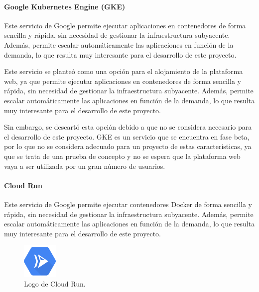
                \paragraph{Google Kubernetes Engine (GKE)}

                    Este servicio de Google permite ejecutar aplicaciones en contenedores de forma sencilla y rápida, sin necesidad de gestionar la infraestructura subyacente. Además, permite escalar automáticamente las aplicaciones en función de la demanda, lo que resulta muy interesante para el desarrollo de este proyecto.

                    Este servicio se planteó como una opción para el alojamiento de la plataforma web, ya que permite ejecutar aplicaciones en contenedores de forma sencilla y rápida, sin necesidad de gestionar la infraestructura subyacente. Además, permite escalar automáticamente las aplicaciones en función de la demanda, lo que resulta muy interesante para el desarrollo de este proyecto.

                    Sin embargo, se descartó esta opción debido a que no se considera necesario para el desarrollo de este proyecto. GKE es un servicio que se encuentra en fase beta, por lo que no se considera adecuado para un proyecto de estas características, ya que se trata de una prueba de concepto y no se espera que la plataforma web vaya a ser utilizada por un gran número de usuarios.

                \paragraph{Cloud Run}

                    Este servicio de Google permite ejecutar contenedores Docker de forma sencilla y rápida, sin necesidad de gestionar la infraestructura subyacente. Además, permite escalar automáticamente las aplicaciones en función de la demanda, lo que resulta muy interesante para el desarrollo de este proyecto.

                    \begin{figure}
                        \centering

                        \includegraphics[width=0.15\textwidth]{images/Logos/cloud-run.png}
                        \caption{Logo de Cloud Run.}
                        
                        \label{fig:cloud-run-logo}
                    \end{figure}

